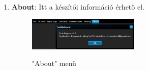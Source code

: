 \begin{enumerate}
{\begin{figure}[h!]
\begin{center}
				\label{fig:example}
			\end{center}
		\end{figure}
	}
	\item{
		\textbf{About}: Itt a készítői információ érhető el.
		\begin{figure}[h!]
			\begin{center}
				\caption{"About" menü}
				\includegraphics[width=0.5\textwidth, keepaspectratio=true]{images/img_ui_about}\\
				\label{fig:example}
			\end{center}
		\end{figure}
	}
\end{enumerate}


